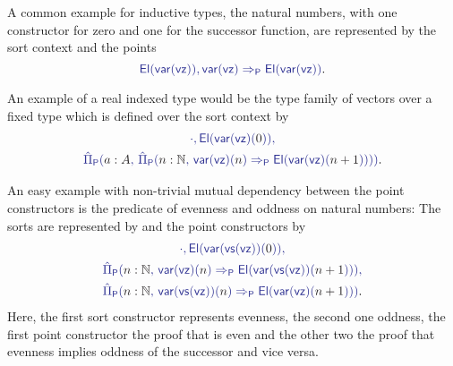 \begin{example}\label{ex:if-natvec}
A common example for inductive types, the natural numbers, with one constructor for
zero and one for the successor function, are represented by the sort context
\tqm{\cdot_\Sc,\, \UU} and the points
\begin{equation*}
\tqm{\El(\var(\vz)), \var(\vz) \Rightarrow_\Pc \El(\var(\vz))} \text{.}
\end{equation*}

An example of a real indexed type would be the type family of vectors over a fixed
type  which is defined over the sort context
 by
\begin{equation*}
\begin{gathered}
\tqm{\cdot, \El(\var(\vz)(\blm{0})),}\\
\tqm{\ExtPiP{a : A}{\ExtPiP{n : \N}{\var(\vz)(\blm{n}) \Rightarrow_\Pc \El(\var(\vz)(\blm{n + 1}))}}} \text{.}
\end{gathered}
\end{equation*}

An easy example with non-trivial mutual dependency between the point constructors
is the predicate of evenness and oddness on natural numbers: The sorts are
represented by 
and the point constructors by
\begin{equation*}
\begin{gathered}
\tqm{\cdot , \El(\var(\vs(\vz))(\blm{0})),} \\
\tqm{\ExtPiP{n : \N}{\var(\vz)(\blm{n}) \Rightarrow_\Pc \El(\var(\vs(\vz))(\blm{n + 1}))},} \\
\tqm{\ExtPiP{n:\N}{\var(\vs(\vz))(\blm{n}) \Rightarrow_\Pc \El(\var(\vz)(\blm{n + 1}))}} \text{.}
\end{gathered}
\end{equation*}
Here, the first sort constructor represents evenness, the second one oddness,
the first point constructor the proof that  is even and the other two the
proof that evenness implies oddness of the successor and vice versa.
\end{example}

